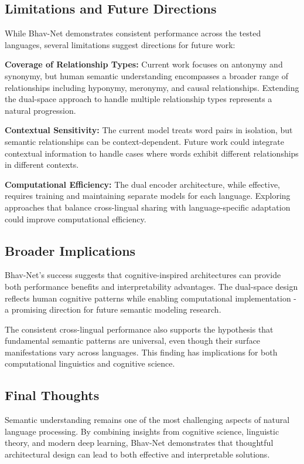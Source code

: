 \documentclass[11pt]{article}
\begin{document}
\subsection{Limitations and Future Directions}

While Bhav-Net demonstrates consistent performance across the tested languages, several limitations suggest directions for future work:

\textbf{Coverage of Relationship Types:} Current work focuses on antonymy and synonymy, but human semantic understanding encompasses a broader range of relationships including hyponymy, meronymy, and causal relationships. Extending the dual-space approach to handle multiple relationship types represents a natural progression.

\textbf{Contextual Sensitivity:} The current model treats word pairs in isolation, but semantic relationships can be context-dependent. Future work could integrate contextual information to handle cases where words exhibit different relationships in different contexts.

\textbf{Computational Efficiency:} The dual encoder architecture, while effective, requires training and maintaining separate models for each language. Exploring approaches that balance cross-lingual sharing with language-specific adaptation could improve computational efficiency.

\subsection{Broader Implications}

Bhav-Net's success suggests that cognitive-inspired architectures can provide both performance benefits and interpretability advantages. The dual-space design reflects human cognitive patterns while enabling computational implementation - a promising direction for future semantic modeling research.

The consistent cross-lingual performance also supports the hypothesis that fundamental semantic patterns are universal, even though their surface manifestations vary across languages. This finding has implications for both computational linguistics and cognitive science.

\subsection{Final Thoughts}

Semantic understanding remains one of the most challenging aspects of natural language processing. By combining insights from cognitive science, linguistic theory, and modern deep learning, Bhav-Net demonstrates that thoughtful architectural design can lead to both effective and interpretable solutions.
\end{document}
